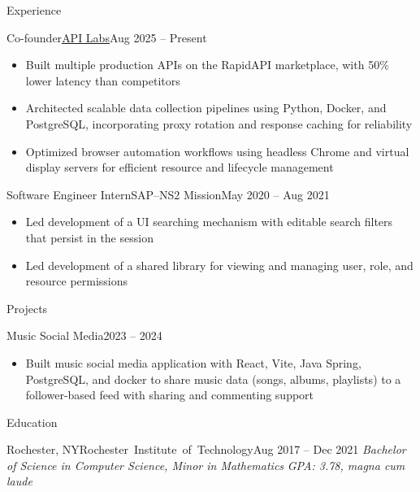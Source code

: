 \documentclass[]{mcdowellcv}
\begin{document}
\begin{cvsection}{Experience}
        \begin{cvsubsection}{Co-founder}{\underline{\href{https://rapidapi.com/organization/api-labs1}{API Labs}}}{Aug 2025 -- Present}	
            \begin{itemize}
                \item Built multiple production APIs on the RapidAPI marketplace, with 50\% lower latency than competitors
                \item Architected scalable data collection pipelines using Python, Docker, and PostgreSQL, incorporating proxy rotation and response caching for reliability
                \item Optimized browser automation workflows using headless Chrome and virtual display servers for efficient resource and lifecycle management
            \end{itemize}
        \end{cvsubsection}

		\begin{cvsubsection}{Software Engineer Intern}{SAP--NS2 Mission}{May 2020 -- Aug 2021}	
			\begin{itemize}
				\item Led development of a UI searching mechanism with editable search filters that persist in the session
				\item Led development of a shared library for viewing and managing user, role, and resource permissions
			\end{itemize}
		\end{cvsubsection}
	\end{cvsection}

	\begin{cvsection}{Projects}
        \begin{cvsubsection}{Music Social Media}{}{2023 -- 2024}
			\begin{itemize}
                \item Built music social media application with React, Vite, Java Spring, PostgreSQL, and docker to share music data (songs, albums, playlists) to a follower-based feed with sharing and commenting support
			\end{itemize}
		\end{cvsubsection}
	\end{cvsection}

    \begin{cvsection}{Education}
		\begin{cvsubsection}{Rochester, NY}{\mbox{Rochester Institute of Technology}}{Aug 2017 -- Dec 2021}
            \textit{Bachelor of Science in Computer Science, Minor in Mathematics} \hfill \textit{GPA: 3.78, magna cum laude}
		\end{cvsubsection}
	\end{cvsection}
\end{document}
